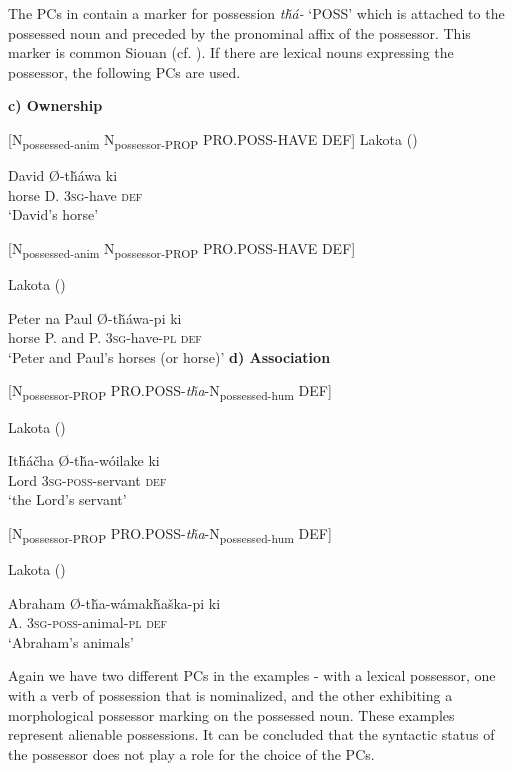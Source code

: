 \documentclass[output=paper]{LSP/langsci}
\begin{document}
The PCs in  contain a marker for possession \textit{t\v{h}á-} `POSS' which is attached to the possessed noun and preceded by the pronominal affix of the possessor. This marker is common Siouan (cf. \citealt{RankinEtAl2015}). If there are lexical nouns expressing the possessor, the following PCs are used.

\vspace{1em}
\textbf{c)	Ownership}

[N\textsubscript{possessed-anim} N\textsubscript{possessor-PROP} PRO.POSS-HAVE DEF] 
\ea	Lakota (\citealt[91]{Buechel1939}) \label{lakotadavidshorse}

   David   Ø-t\v{h}áwa    ki \\
horse      D.   \textsc{3sg}-have  \textsc{def} \\
\glt `David's horse'
\z

[N\textsubscript{possessed-anim} N\textsubscript{possessor-PROP} PRO.POSS-HAVE DEF]

\ea Lakota (\citealt[91]{Buechel1939})

 Peter  na  Paul   Ø-t\v{h}áwa-pi     ki  \\
horse    P.       and P.      \textsc{3sg}-have-\textsc{pl} \textsc{def} \\
\glt `Peter and Paul's horses (or horse)'
\z
\textbf{d)	Association}

[N\textsubscript{possessor-PROP} PRO.POSS-\textit{t\v{h}a}-N\textsubscript{possessed-hum} DEF]

\ea	Lakota (\citealt[92]{Buechel1939})

\gll It\v{h}\'a\v{c}ha    Ø-t\v{h}a-wóilake   ki  \\
Lord   \textsc{3sg-poss}-servant   \textsc{def} \\
\glt `the Lord's servant'
\z

[N\textsubscript{possessor-PROP} PRO.POSS-\textit{t\v{h}a}-N\textsubscript{possessed-hum} DEF]

\ea	Lakota (\citealt[92]{Buechel1939}) \label{lakotaabraham}

\gll Abraham Ø-t\v{h}a-w\'amak\v{h}a\v{s}ka-pi ki  \\
 A. \textsc{3sg-poss}-animal-\textsc{pl}  \textsc{def} \\
\glt `Abraham's animals'
\z

Again we have two different PCs in the examples - with a lexical possessor, one with a verb of possession that is nominalized, and the other exhibiting a morphological possessor marking on the possessed noun. These examples represent alienable possessions. It can be concluded that the syntactic status of the possessor does not play a role for the choice of the PCs.
\end{document}
